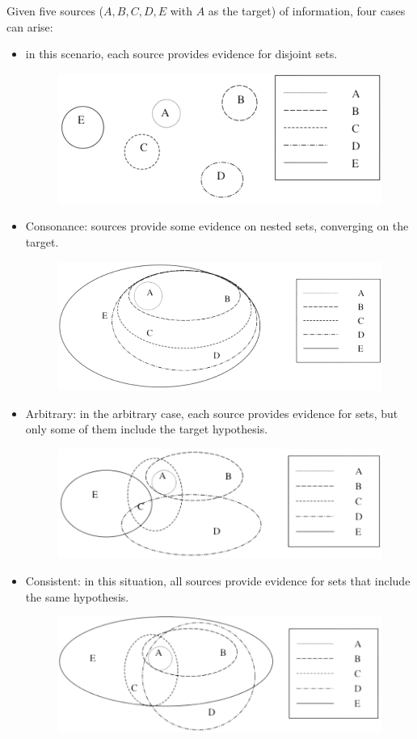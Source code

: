 Given five sources ($A, B, C, D, E$ with $A$ as the target) of information, four cases can arise:
\begin{itemize}
    \item in this scenario, each source provides evidence for disjoint sets.
        \begin{figure}[H]
            \centering
            \includegraphics[width=0.5\linewidth]{images/conflict.png}
        \end{figure}
    \item Consonance: sources provide some evidence on nested sets, converging on the target.
        \begin{figure}[H]
            \centering
            \includegraphics[width=0.5\linewidth]{images/consonance.png}
        \end{figure}
    \item Arbitrary: in the arbitrary case, each source provides evidence for sets, but only some of them include the target hypothesis.
        \begin{figure}[H]
            \centering
            \includegraphics[width=0.5\linewidth]{images/arbitrary.png}
        \end{figure}
    \item Consistent: in this situation, all sources provide evidence for sets that include the same hypothesis.
        \begin{figure}[H]
            \centering
            \includegraphics[width=0.5\linewidth]{images/consistent.png}
        \end{figure}
\end{itemize}
